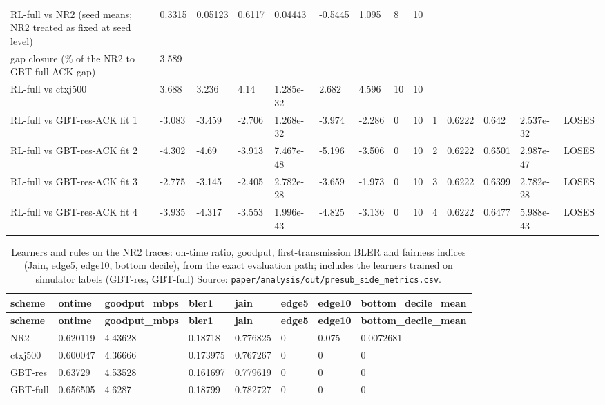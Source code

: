 \documentclass[10pt]{article}
\begin{document}
\begin{landscape}
\begin{longtable}{@{}llllllllllllll@{}}
\midrule
\endhead
RL-full vs NR2 (seed means; NR2 treated as fixed at seed level) & 0.3315 & 0.05123 & 0.6117 & 0.04443 & -0.5445 & 1.095 & 8 & 10 &  &  &  &  &  \\
gap closure (\% of the NR2 to GBT-full-ACK gap) & 3.589 &  &  &  &  &  &  &  &  &  &  &  &  \\
RL-full vs ctxj500 & 3.688 & 3.236 & 4.14 & 1.285e-32 & 2.682 & 4.596 & 10 & 10 &  &  &  &  &  \\
RL-full vs GBT-res-ACK fit 1 & -3.083 & -3.459 & -2.706 & 1.268e-32 & -3.974 & -2.286 & 0 & 10 & 1 & 0.6222 & 0.642 & 2.537e-32 & LOSES \\
RL-full vs GBT-res-ACK fit 2 & -4.302 & -4.69 & -3.913 & 7.467e-48 & -5.196 & -3.506 & 0 & 10 & 2 & 0.6222 & 0.6501 & 2.987e-47 & LOSES \\
RL-full vs GBT-res-ACK fit 3 & -2.775 & -3.145 & -2.405 & 2.782e-28 & -3.659 & -1.973 & 0 & 10 & 3 & 0.6222 & 0.6399 & 2.782e-28 & LOSES \\
RL-full vs GBT-res-ACK fit 4 & -3.935 & -4.317 & -3.553 & 1.996e-43 & -4.825 & -3.136 & 0 & 10 & 4 & 0.6222 & 0.6477 & 5.988e-43 & LOSES \\
\bottomrule
\end{longtable}
\normalsize
\tiny
\setlength{\tabcolsep}{2pt}
\begin{longtable}{@{}llllllll@{}}
\caption{Learners and rules on the NR2 traces: on-time ratio, goodput, first-transmission BLER and fairness indices (Jain, edge5, edge10, bottom decile), from the exact evaluation path; includes the learners trained on simulator labels (GBT-res, GBT-full) Source: \texttt{paper/analysis/out/presub\_side\_metrics.csv}.}\\
\toprule
\textbf{scheme} & \textbf{ontime} & \textbf{goodput\_mbps} & \textbf{bler1} & \textbf{jain} & \textbf{edge5} & \textbf{edge10} & \textbf{bottom\_decile\_mean} \\
\midrule
\endfirsthead
\toprule
\textbf{scheme} & \textbf{ontime} & \textbf{goodput\_mbps} & \textbf{bler1} & \textbf{jain} & \textbf{edge5} & \textbf{edge10} & \textbf{bottom\_decile\_mean} \\
\midrule
\endhead
NR2 & 0.620119 & 4.43628 & 0.18718 & 0.776825 & 0 & 0.075 & 0.0072681 \\
ctxj500 & 0.600047 & 4.36666 & 0.173975 & 0.767267 & 0 & 0 & 0 \\
GBT-res & 0.63729 & 4.53528 & 0.161697 & 0.779619 & 0 & 0 & 0 \\
GBT-full & 0.656505 & 4.6287 & 0.18799 & 0.782727 & 0 & 0 & 0 \\

\end{longtable}
\end{landscape}
\end{document}
